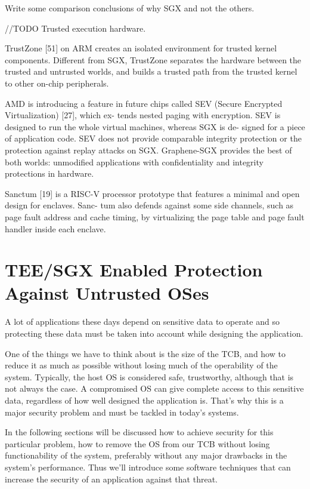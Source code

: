 Write some comparison conclusions of why SGX and not the others.

//TODO
Trusted execution hardware.

TrustZone [51] on ARM creates an isolated
environment for trusted kernel components. Different
from SGX, TrustZone separates the hardware between
the trusted and untrusted worlds, and builds a trusted path
from the trusted kernel to other on-chip peripherals.

AMD is introducing a feature in future chips called
SEV (Secure Encrypted Virtualization) [27], which ex-
tends nested paging with encryption. SEV is designed
to run the whole virtual machines, whereas SGX is de-
signed for a piece of application code. SEV does not
provide comparable integrity protection or the protection
against replay attacks on SGX. Graphene-SGX provides
the best of both worlds: unmodified applications with
confidentiality and integrity protections in hardware.

Sanctum [19] is a RISC-V processor prototype that
features a minimal and open design for enclaves. Sanc-
tum also defends against some side channels, such as
page fault address and cache timing, by virtualizing the
page table and page fault handler inside each enclave.





\section{TEE/SGX Enabled Protection Against Untrusted OSes} %
\label{sec:tee_enabled_frameworks}

A lot of applications these days depend on sensitive data to operate and so protecting these data must be taken into account while designing the application. 

One of the things we have to think about is the size of the TCB, and how to reduce it as much as possible without losing much of the operability of the system. Typically, the host OS is considered safe, trustworthy, although that is not always the case. A compromised OS can give complete access to this sensitive data, regardless of how well designed the application is. That's why this is a major security problem and must be tackled in today's systems. 

In the following sections will be discussed how to achieve security for this particular problem, how to remove the OS from our TCB without losing functionability of the system, preferably without any major drawbacks in the system's performance. Thus we'll introduce some software techniques that can increase the security of an application against that threat.

